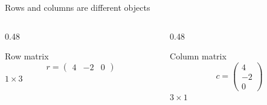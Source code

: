 \begin{frame}{Rows and columns are different objects}
  \begin{columns}[T,onlytextwidth]
    \begin{column}{0.48\textwidth}
      \begin{block}{Row matrix}
        \[
        r=\begin{pmatrix}4&-2&0\end{pmatrix}
        \]
        \centering $1\times3$
      \end{block}
    \end{column}
    \begin{column}{0.48\textwidth}
      \begin{exampleblock}{Column matrix}
        \[
        c=\begin{pmatrix}4\\-2\\0\end{pmatrix}
        \]
        \centering $3\times1$
      \end{exampleblock}
    \end{column}
  \end{columns}

  \vspace{0.5cm}
\end{frame}

